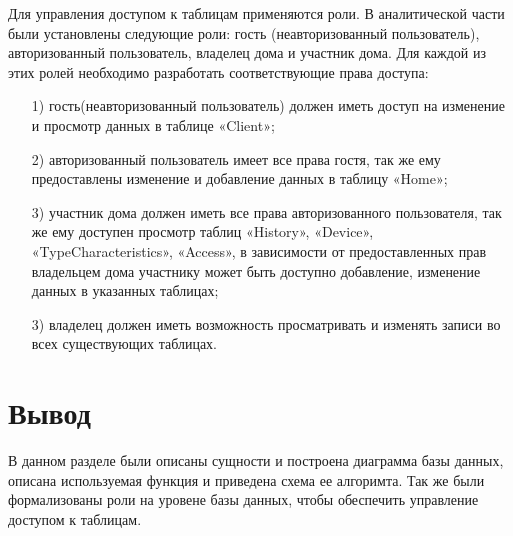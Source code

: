 Для управления доступом к таблицам применяются роли. 
В аналитической части были установлены следующие роли: 
гость (неавторизованный пользователь), авторизованный 
пользователь, владелец дома и участник дома. 
Для каждой из этих ролей необходимо разработать 
соответствующие права доступа:
\begin{enumerate}
    \item[1)] гость(неавторизованный пользователь) должен
    иметь доступ на изменение и просмотр данных в таблице «Client»;
    \item[2)] авторизованный пользователь имеет все права
    гостя, так же ему предоставлены изменение и добавление данных
    в таблицу «Home»;
    \item[3)] участник дома должен иметь все права авторизованного 
    пользователя, так же ему доступен просмотр таблиц
    «History», «Device», «TypeCharacteristics», «Access», в зависимости
    от предоставленных прав владельцем дома участнику может быть
    доступно добавление, изменение данных в указанных таблицах;
    \item[3)] владелец должен иметь возможность 
    просматривать и изменять записи во всех существующих таблицах.
\end{enumerate}

\section*{Вывод}

В данном разделе были описаны сущности и построена диаграмма
базы данных, описана используемая функция и приведена схема ее алгоримта.
Так же были формализованы роли на уровене базы
данных, чтобы обеспечить управление доступом к таблицам.
